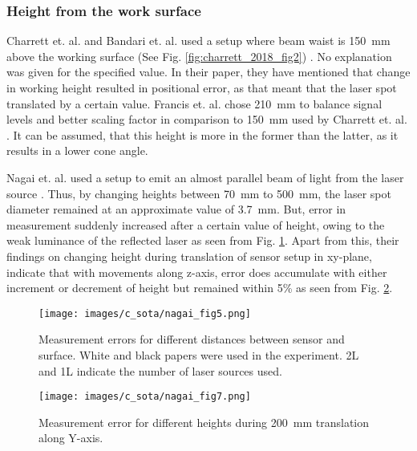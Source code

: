     
    \subsubsection*{Height from the work surface}
    Charrett et. al. and Bandari et. al. used a setup where beam waist is \SI{150}{\milli\meter} above the working surface (See Fig. \ref{fig:charrett_2018_fig2}) \cite{charrett_2018} \cite{bandari}. No explanation was given for the specified value. In their paper, they have mentioned that change in working height resulted in positional error, as that meant that the laser spot translated by a certain value. Francis et. al. chose \SI{210}{\milli\meter} \cite{francis_autonomous} to balance signal levels and better scaling factor in comparison to \SI{150}{\milli\meter} used by Charrett et. al. \cite{charrett_2018}. It can be assumed, that this height is more in the former than the latter, as it results in a lower cone angle.

    \vspace{5mm}

    \noindent Nagai et. al. used a setup to emit an almost parallel beam of light from the laser source \cite{nagai}. Thus, by changing heights between \SI{70}{\milli\meter} to \SI{500}{\milli\meter}, the laser spot diameter remained at an approximate value of \SI{3.7}{\milli\meter}. But, error in measurement suddenly increased after a certain value of height, owing to the weak luminance of the reflected laser as seen from Fig. \ref{fig:nagai_fig5}. Apart from this, their findings on changing height during translation of sensor setup in xy-plane, indicate that with movements along z-axis, error does accumulate with either increment or decrement of height but remained within 5\% as seen from Fig. \ref{fig:nagai_fig7}.

    \begin{figure}[h]
        \centering
        \texttt{[image: images/c\_sota/nagai\_fig5.png]}
        \caption{Measurement errors for different distances between sensor and surface. White and black papers were used in the experiment. 2L and 1L indicate the number of laser sources used. \cite{nagai}}
        \label{fig:nagai_fig5}
    \end{figure}

    \begin{figure}[h]
        \centering
        \texttt{[image: images/c\_sota/nagai\_fig7.png]}
        \caption{Measurement error for different heights during \SI{200}{\milli\meter} translation along Y-axis. \cite{nagai}}
        \label{fig:nagai_fig7}
    \end{figure}

